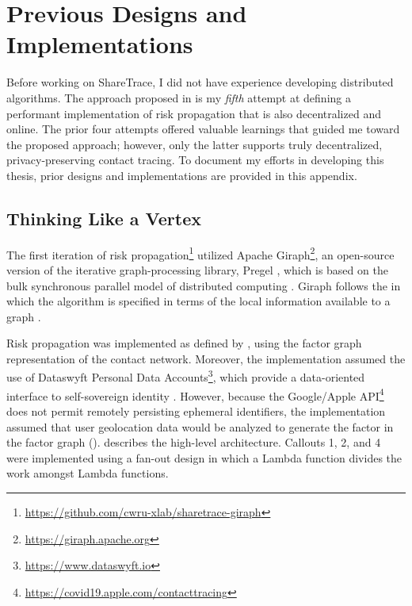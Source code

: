 \chapter{Previous Designs and Implementations}\label{sec:previous-designs}


Before working on ShareTrace, I did not have experience developing distributed algorithms. The approach proposed in  is my \emph{fifth} attempt at defining a performant implementation of risk propagation that is also decentralized and online. The prior four attempts offered valuable learnings that guided me toward the proposed approach; however, only the latter supports truly decentralized, privacy-preserving contact tracing. To document my efforts in developing this thesis, prior designs and implementations are provided in this appendix.

\section{Thinking Like a Vertex}\label{sec:giraph}

The first iteration of risk propagation\footnote{\url{https://github.com/cwru-xlab/sharetrace-giraph}} utilized Apache Giraph\footnote{\url{https://giraph.apache.org}}, an open-source version of the iterative graph-processing library, Pregel \citep{Malewicz2010}, which is based on the bulk synchronous parallel model of distributed computing \citep{Valiant1990}. Giraph follows the  in which the algorithm is specified in terms of the local information available to a graph \vertexName{} \citep{McCune2015}.

Risk propagation was implemented as defined by \citet{Ayday2020,Ayday2021}, using the factor graph representation of the contact network. Moreover, the implementation assumed the use of Dataswyft Personal Data Accounts\footnote{\url{https://www.dataswyft.io}}, which provide a data-oriented interface to self-sovereign identity \citep[pp. 98--99]{Preukschat2021}. However, because the Google/Apple API\footnote{\url{https://covid19.apple.com/contacttracing}} does not permit remotely persisting ephemeral identifiers, the implementation assumed that user geolocation data would be analyzed to generate the factor \verticesName{} in the factor graph ().  describes the high-level architecture. Callouts 1, 2, and 4 were implemented using a fan-out design in which a  Lambda function divides the work amongst  Lambda functions.

